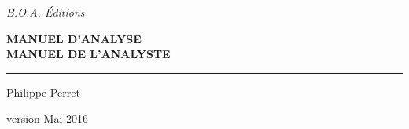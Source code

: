 
\begin{titlepage}
	\begin{center}\LARGE
		\textit{B.O.A. Éditions}
	\end{center}
	\selectfont

	\begin{flushleft}\huge\bfseries
    MANUEL D'ANALYSE \\
		{\small MANUEL DE L'ANALYSTE}
	\end{flushleft}

	\hrule

	\begin{flushright}
		Philippe Perret
	\end{flushright}

	\begin{flushleft}\itshape\small
	\end{flushleft}

	\begin{center}
    version Mai 2016
	\end{center}
\end{titlepage}

